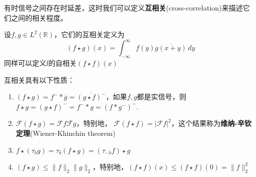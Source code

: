 有时信号之间存在时延差，这时我们可以定义\textbf{互相关}(cross-correlation)来描述它
们之间的相关程度。
\begin{definition}[互相关]
设$f,g\in L^2(\mathbb{R})$，它们的互相关定义为
\begin{equation}
    (f\star g)(x)=\int_{-\infty}^{\infty}f(y)\overline{g(x+y)}\,dy
\end{equation}
同样可以定义f的自相关$(f\star f)(x)$
\end{definition}
互相关具有以下性质：
\begin{proposition}[互相关的性质]
\begin{enumerate}
    \quad
    \item $(f\star g) =f^-* \overline{g}=\overline{(g\star f)^-}$，如果$f,g$都是实信号，则$f\star g = (g\star f)^- =f^- *g=(f*g^-)^-$.
    \item $\mathcal{F} (f\star g) =\mathcal{F} f\overline{\mathcal{F} g}$，特别地，
          $\mathcal{F} (f\star f) =|\mathcal{F} f|^2$，这个结果称为\textbf{维纳-辛钦定理}(Wiener-Khinchin theorem)
    \item $f\star (\tau_b g)=\tau_{b} (f\star g)=(\tau_{-b}f)\star g$
    \item $(f\star g)\leq\|f\|_2\|g\|_2$，特别地，$(f\star f)(x)\leq (f\star f)(0)=\|f\|_2^2$
\end{enumerate}
\end{proposition}
